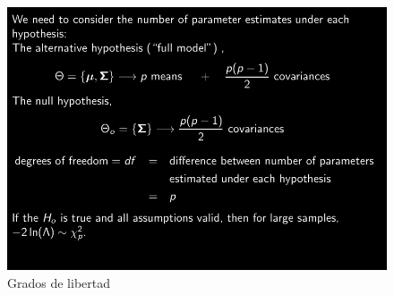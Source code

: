 \documentclass[10pt,a4paper]{article} %
\begin{document}
        \begin{figure}[h!]
            \centering
            \includegraphics[width=0.8\linewidth]{gradoslibertad.png}
            \caption{Grados de libertad}
            \label{aaaaaa}
        \end{figure}
























    \nocite{*}
    
    
\end{document}
